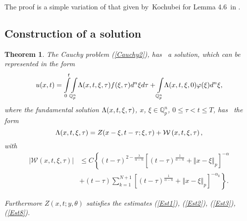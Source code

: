 \documentclass{amsart}\usepackage{amsfonts}
\newtheorem{theorem}{Theorem}[section]
\theoremstyle{plain}
\numberwithin{equation}{section}
\begin{document}
The proof is a simple variation of that given by\ Kochubei for Lemma 4.6\ in
\cite{Koch}.

\subsection{Construction of a solution}

\begin{theorem}
\label{mainTheo}The Cauchy problem (\ref{Cauchy2}), has \ a solution, which
can be represented in the form\begin{equation}
u(x,t)={\displaystyle\int\limits_{0}^{t}}
{\displaystyle\int\limits_{\mathbb{Q}_{p}^{n}}}
{\LARGE \Lambda}(x,t,\xi,\tau)f(\xi,\tau)d^{n}\xi d\tau+{\displaystyle\int\limits_{\mathbb{Q}_{p}^{n}}}
{\LARGE \Lambda}(x,t,\xi,0)\varphi(\xi)d^{n}\xi, \label{u(x,t)}\end{equation}
where the fundamental solution ${\LARGE \Lambda}(x,t,\xi,\tau)$, $x$, $\xi
\in\mathbb{Q}_{p}^{n}$, $0\leq\tau<t\leq T$, has \ the form\begin{equation}
{\LARGE \Lambda}(x,t,\xi,\tau)=Z(x-\xi,t-\tau;\xi,\tau)+\mathcal{W}\left(
x,t,\xi,\tau\right)  , \label{Gamma}\end{equation}
with\begin{align}
\left\vert \mathcal{W}\left(  x,t,\xi,\tau\right)  \right\vert  &  \leq
C\left\{  (t-\tau)^{2-\frac{\lambda}{\alpha-n}}\left[  (t-\tau)^{\frac
{1}{\alpha-n}}+\left\Vert x-\xi\right\Vert _{p}\right]  ^{-\alpha}\right.
\label{Cotateo}\\
&  +\left.  (t-\tau){\displaystyle\sum\limits_{k=1}^{N+1}}
\left[  (t-\tau)^{\frac{1}{\alpha-n}}+\left\Vert x-\xi\right\Vert _{p}\right]
^{-\alpha_{k}}\right\}  .\nonumber
\end{align}


Furthermore $Z(x,t;y,\theta)$ satisfies the estimates (\ref{Est1}),
(\ref{Est2}), (\ref{Est3}), (\ref{Est8}).
\end{theorem}
\end{document}
